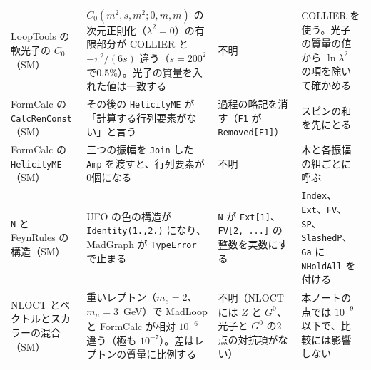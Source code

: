 \documentclass[a4paper,10pt]{ltjsarticle}
\begin{document}
\begin{table}[tbp]
\begin{tabularx}{\linewidth}{>{\raggedright\arraybackslash}p{2.4cm}>{\raggedright\arraybackslash}X>{\raggedright\arraybackslash}X>{\raggedright\arraybackslash}X}
LoopTools の軟光子の $C_0$（SM） & $C_0(m^2,s,m^2;0,m,m)$ の次元正則化（$\lambda^2=0$）の有限部分が COLLIER と $-\pi^2/(6s)$ 違う（$s=200^2$ で0.5\%）。光子の質量を入れた値は一致する & 不明 & COLLIER を使う。光子の質量の値から $\ln\lambda^2$ の項を除いて確かめる \\
FormCalc の \texttt{CalcRenConst}（SM） & その後の \texttt{HelicityME} が「計算する行列要素がない」と言う & 過程の略記を消す（\texttt{F1} が \texttt{Removed[F1]}） & スピンの和を先にとる \\
FormCalc の \texttt{HelicityME}（SM） & 三つの振幅を \texttt{Join} した \texttt{Amp} を渡すと、行列要素が0個になる & 不明 & 木と各振幅の組ごとに呼ぶ \\
\texttt{N} と FeynRules の構造（SM） & UFO の色の構造が \texttt{Identity(1.,2.)} になり、MadGraph が \texttt{TypeError} で止まる & \texttt{N} が \texttt{Ext[1]}、\texttt{FV[2, ...]} の整数を実数にする & \texttt{Index}、\texttt{Ext}、\texttt{FV}、\texttt{SP}、\texttt{SlashedP}、\texttt{Ga} に \texttt{NHoldAll} を付ける \\
NLOCT とベクトルとスカラーの混合（SM） & 重いレプトン（$m_e=2$、$m_\mu=3$~GeV）で MadLoop と FormCalc が相対 $10^{-6}$ 違う（極も $10^{-7}$）。差はレプトンの質量に比例する & 不明（NLOCT には $Z$ と $G^0$、光子と $G^0$ の2点の対抗項がない） & 本ノートの点では $10^{-9}$ 以下で、比較には影響しない \\
\bottomrule
\end{tabularx}
\end{table}
\end{document}
